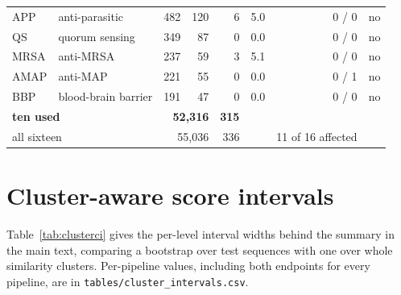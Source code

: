 \documentclass[11pt,a4paper]{article}
\begin{document}
\begin{table}[htbp]
\begin{tabular}{llrrrrrc}
APP   & anti-parasitic        &     482  &    120  &   6 & 5.0  & 0 / 0    & no \\
QS    & quorum sensing        &     349  &     87  &   0 & 0.0  & 0 / 0    & no \\
MRSA  & anti-MRSA             &     237  &     59  &   3 & 5.1  & 0 / 0    & no \\
AMAP  & anti-MAP              &     221  &     55  &   0 & 0.0  & 0 / 1    & no \\
BBP   & blood-brain barrier   &     191  &     47  &   0 & 0.0  & 0 / 0    & no \\
\midrule
\multicolumn{2}{l}{\textbf{ten used}} & \multicolumn{2}{r}{\textbf{52{,}316}} & \textbf{315} & & & \\
\multicolumn{2}{l}{all sixteen}       & \multicolumn{2}{r}{55{,}036}          & 336 & & 11 of 16 affected & \\
\bottomrule
\end{tabular}
\end{table}

\section{Cluster-aware score intervals}

Table~\ref{tab:clusterci} gives the per-level interval widths behind the summary
in the main text, comparing a bootstrap over test sequences with one over whole
similarity clusters. Per-pipeline values, including both endpoints for every
pipeline, are in \texttt{tables/cluster\_intervals.csv}.
\end{document}
